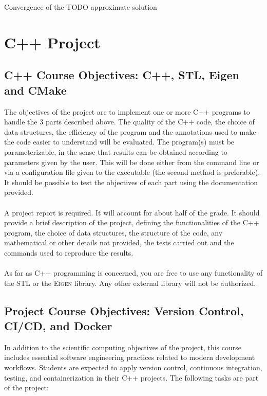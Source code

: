 \documentclass[english,10pt,a4paper]{article}
\begin{document}
Convergence of the TODO approximate solution

\section{C++ Project}

\subsection{C++ Course Objectives: C++, STL, Eigen and CMake}

The objectives of the project are to implement one or more C++ programs to handle the 3 parts described above.
The quality of the C++ code, the choice of data structures, the efficiency of the program and the annotations used to make the code easier to understand will be evaluated.
The program(s) must be parameterizable, in the sense that results can be obtained according to parameters given by the user.
This will be done either from the command line or via a configuration file given to the executable (the second method is preferable).
It should be possible to test the objectives of each part using the documentation provided.

\paragraph{}
A project report is required. It will account for about half of the grade. It should provide a brief description of the project, defining the functionalities of the C++ program,
the choice of data structures, the structure of the code, any mathematical or other details not provided, the tests carried out and the commands used to reproduce the results.

\paragraph{}
As far as C++ programming is concerned, you are free to use any functionality of the STL or the \textsc{Eigen} library. Any other external library will not be authorized.


\subsection{Project Course Objectives: Version Control, CI/CD, and Docker}

In addition to the scientific computing objectives of the project, this course includes essential software engineering practices related to modern development workflows. Students are expected to apply version control, continuous integration, testing, and containerization in their C++ projects. The following tasks are part of the project:
\end{document}
